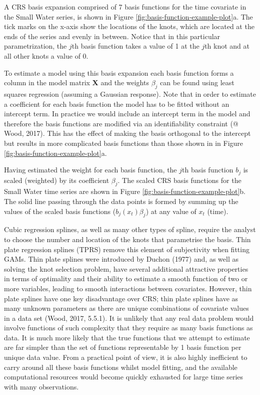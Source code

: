 \documentclass[12pt,]{article}
\begin{document}
A CRS basis expansion comprised of 7 basis functions for the time
covariate in the Small Water series, is shown in Figure
\ref{fig:basis-function-example-plot}a. The tick marks on the x-axis
show the locations of the knots, which are located at the ends of the
series and evenly in between. Notice that in this particular
parametrization, the \(j\)th basis function takes a value of 1 at the
\(j\)th knot and at all other knots a value of 0.

To estimate a model using this basis expansion each basis function forms
a column in the model matrix \textbf{X} and the weights \(\beta_j\) can
be found using least squares regression (assuming a Gaussian response).
Note that in order to estimate a coefficient for each basis function the
model has to be fitted without an intercept term. In practice we would
include an intercept term in the model and therefore the basis functions
are modified via an identifiability constraint (@ Wood, 2017). This has
the effect of making the basis orthogonal to the intercept but results
in more complicated basis functions than those shown in in Figure
\ref{fig:basis-function-example-plot}a.

Having estimated the weight for each basis function, the \(j\)th basis
function \(b_j\) is scaled (weighted) by its coefficient \(\beta_j\).
The scaled CRS basis functions for the Small Water time series are shown
in Figure \ref{fig:basis-function-example-plot}b. The solid line passing
through the data points is formed by summing up the values of the scaled
basis functions (\(b_j(x_t) \beta_j\)) at any value of \(x_t\) (time).

Cubic regression splines, as well as many other types of spline, require
the analyst to choose the number and location of the knots that
parametrise the basis. Thin plate regression splines (TPRS) remove this
element of subjectivity when fitting GAMs. Thin plate splines were
introduced by Duchon (1977) and, as well as solving the knot selection
problem, have several additional attractive properties in terms of
optimality and their ability to estimate a smooth function of two or
more variables, leading to smooth interactions between covariates.
However, thin plate splines have one key disadvantage over CRS; thin
plate splines have as many unknown parameters as there are unique
combinations of covariate values in a data set (Wood, 2017, 5.5.1). It
is unlikely that any real data problem would involve functions of such
complexity that they require as many basis functions as data. It is much
more likely that the true functions that we attempt to estimate are far
simpler than the set of functions representable by 1 basis function per
unique data value. From a practical point of view, it is also highly
inefficient to carry around all these basis functions whilst model
fitting, and the available computational resources would become quickly
exhausted for large time series with many observations.
\end{document}
